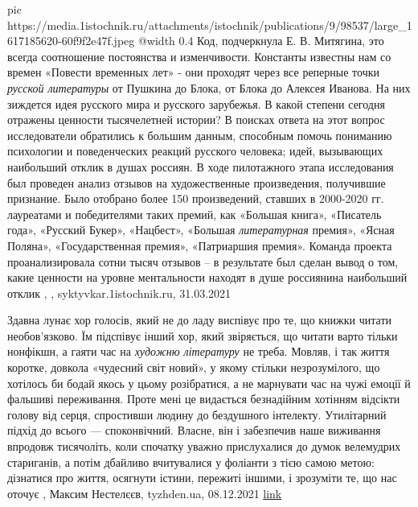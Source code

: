 \ifcmt
  pic https://media.1istochnik.ru/attachments/istochnik/publications/9/98537/large_1617185620-60f9f2e47f.jpeg
  @width 0.4
\fi
Код, подчеркнула Е. В. Митягина, это всегда соотношение постоянства и
изменчивости. Константы известны нам со времен «Повести временных лет» - они
проходят через все реперные точки \emph{русской литературы} от Пушкина до Блока, от
Блока до Алексея Иванова. На них зиждется идея русского мира и русского
зарубежья.  В какой степени сегодня отражены ценности тысячелетней истории? В
поисках ответа на этот вопрос исследователи обратились к большим данным,
способным помочь пониманию психологии и поведенческих реакций русского
человека; идей, вызывающих наибольший отклик в душах россиян. 
В ходе пилотажного этапа исследования был проведен анализ отзывов на
художественные произведения, получившие признание. Было отобрано более 150
произведений, ставших в 2000-2020 гг. лауреатами и победителями таких премий,
как «Большая книга», «Писатель года», «Русский Букер», «Нацбест», «Большая
\emph{литературная} премия», «Ясная Поляна», «Государственная премия», «Патриаршия
премия». Команда проекта проанализировала сотни тысяч отзывов – в результате
был сделан вывод о том, какие ценности на уровне ментальности находят в душе
россиянина наибольший отклик
, 
, syktyvkar.1istochnik.ru, 31.03.2021

Здавна лунає хор голосів, який не до ладу виспівує про те, що книжки читати
необов’язково.  Їм підспівує інший хор, який звіряється, що читати варто тільки
нонфікшн, а гаяти час на \emph{художню літературу} не треба. Мовляв, і так
життя коротке, довкола «чудесний світ новий», у якому стільки незрозумілого, що
хотілось би бодай якось у цьому розібратися, а не марнувати час на чужі емоції
й фальшиві переживання. Проте мені це видається безнадійним хотінням відсікти
голову від серця, спростивши людину до бездушного інтелекту.  Утилітарний
підхід до всього — споконвічний. Власне, він і забезпечив наше виживання
впродовж тисячоліть, коли спочатку уважно прислухалися до думок велемудрих
стариганів, а потім дбайливо вчитувалися у фоліанти з тією самою метою:
дізнатися про життя, осягнути істини, пережиті іншими, і зрозуміти те, що нас
оточує
, Максим Нестелєєв, tyzhden.ua, 08.12.2021%
\href{https://tyzhden.ua/Columns/50/253787}{link}
